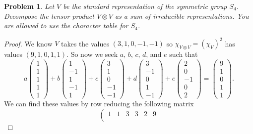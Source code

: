 \documentclass{article}
\newtheorem{problem}{Problem}
\begin{document}
\begin{problem}
Let $V$ be the standard representation of the symmetric group $S_4$. Decompose the tensor product $V \otimes V$ as a sum of irreducible representations. You are allowed to use the character table for $S_4$.
\end{problem}
\begin{proof}
We know $V$ takes the values $(3, 1, 0, -1, -1)$ so $\chi_{V \otimes V} = (\chi_V)^2$ has values $(9, 1, 0, 1, 1)$. So now we seek $a$, $b$, $c$, $d$, and $e$ such that
\[
a \left ( \begin{array}{c} 1 \\ 1 \\ 1 \\ 1 \\ 1 \end{array} \right ) + b \left ( \begin{array}{c} 1 \\ -1 \\ 1 \\ -1 \\ 1 \end{array} \right ) + c \left ( \begin{array}{c} 3 \\ 1 \\ 0 \\ -1 \\ -1 \end{array} \right ) + d \left ( \begin{array}{c} 3 \\ -1 \\ 0 \\ 1 \\ -1 \end{array} \right ) + e \left ( \begin{array}{c} 2 \\ 0 \\ -1 \\ 0 \\ 2 \end{array} \right ) = \left ( \begin{array}{c} 9 \\ 1 \\ 0 \\ 1 \\ 1 \end{array} \right ).
\]
We can find these values by row reducing the following matrix
\[
\left (
\begin{array}{ccccc|c}
1 & 1 & 3 & 3 & 2 & 9\\

\end{array}\]
\end{proof}
\end{document}
